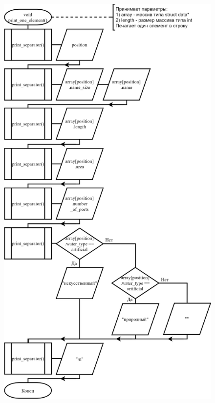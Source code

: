 \begin{figure}[!htp]
    \includegraphics[height=25cm]{../../Makefile-project/src/menu/view_all_elements/view_all_elements-2.png}
\end{figure}

